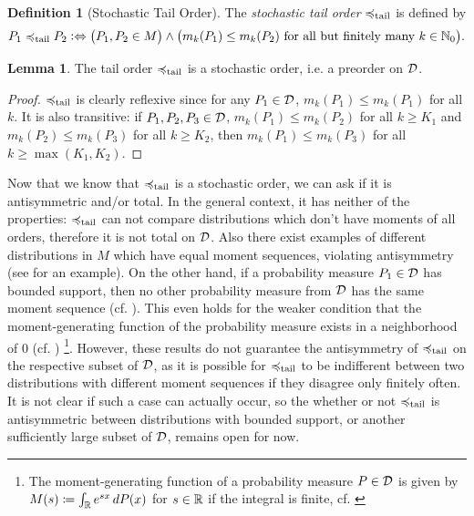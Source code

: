 \documentclass[a4paper]{scrreprt}
\newcommand{\M}{M}
\theoremstyle{definition}
\newtheorem{lemma}[thm]{Lemma} %
\newtheorem{defn}[thm]{Definition} %
\begin{document}
    \begin{defn}[Stochastic Tail Order]
        The \emph{stochastic tail order} $\preccurlyeq_{\text{tail}}$ is defined by
        \begin{gather*}
            P_1 \leqtail P_2 \colonlra \bigpars{P_1, P_2 \in \M} \wedge \bigpars{m_k(P_1) \leq m_k(P_2) \text{ for all but finitely many $k \in \N_0$}}.
        \end{gather*}
    \end{defn}

    \begin{lemma}
        The tail order $\preccurlyeq_{\text{tail}}$ is a stochastic order, i.e. a preorder on $\mathcal{D}$.
    \end{lemma}
    \begin{proof}
        $\preccurlyeq_{\text{tail}}$ is clearly reflexive since for any $P_1 \in \mathcal{D}$, $m_k(P_1) \leq m_k(P_1)$ for all $k$.
        It is also transitive: if $P_1, P_2, P_3 \in \mathcal{D}$, $m_k(P_1) \leq m_k(P_2)$ for all $k \geq K_1$ and $m_k(P_2) \leq m_k(P_3)$ for all $k \geq K_2$, then $m_k(P_1) \leq m_k(P_3)$ for all $k \geq \max(K_1, K_2)$.
    \end{proof}
    
    Now that we know that $\preccurlyeq_{\text{tail}}$ is a stochastic order, we can ask if it is antisymmetric and/or total.
    In the general context, it has neither of the properties: $\preccurlyeq_{\text{tail}}$ can not compare distributions which don't have moments of all orders, therefore it is not total on $\mathcal{D}$.
    Also there exist examples of different distributions in $\M$ which have equal moment sequences, violating antisymmetry (see \cite[Example 3.15]{bib:romanoCounterexamplesInProbability} for an example). 
    On the other hand, if a probability measure $P_1 \in \mathcal{D}$ has bounded support, then no other probability measure from $\mathcal{D}$ has the same moment sequence (cf. \cite[Corollary 4.2]{bib:schmuedgenTheMomentProblem}).
    This even holds for the weaker condition that the moment-generating function of the probability measure exists in a neighborhood of 0 (cf. \cites[Lemma 2.3]{bib:rassGameRiskManagI}[p.414]{bib:billingsleyProbabilityAndMeasure})
     \footnote{The moment-generating function of a probability measure $P \in \mathcal{D}$ is given by $M(s) \coloneqq \int_{\mathbb{R}} e^{sx} \, dP(x)$ for $s \in \mathbb{R}$ if the integral is finite, cf. \cite[(21.21)]{bib:billingsleyProbabilityAndMeasure}}.
    However, these results do not guarantee the antisymmetry of $\preccurlyeq_{\text{tail}}$ on the respective subset of $\mathcal{D}$, as it is possible for $\preccurlyeq_{\text{tail}}$ to be indifferent between two distributions with different moment sequences if they disagree only finitely often. It is not clear if such a case can actually occur, so the whether or not $\preccurlyeq_{\text{tail}}$ is antisymmetric between distributions with bounded support, or another sufficiently large subset of $\mathcal{D}$, remains open for now.
    
\end{document}
